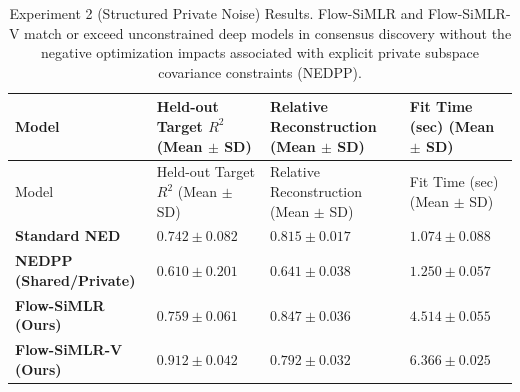 \documentclass[
  letterpaper,
]{report}
\begin{document}
\begin{longtable}[]{@{}
  >{\raggedright\arraybackslash}p{}
  >{\centering\arraybackslash}p{}
  >{\centering\arraybackslash}p{}
  >{\centering\arraybackslash}p{}@{}}
\caption{Experiment 2 (Structured Private Noise) Results. Flow-SiMLR and
Flow-SiMLR-V match or exceed unconstrained deep models in consensus
discovery without the negative optimization impacts associated with
explicit private subspace covariance constraints
(NEDPP).}\label{tbl-exp2-results}\tabularnewline
\toprule\noalign{}
\begin{minipage}[b]{\linewidth}\raggedright
Model
\end{minipage} & \begin{minipage}[b]{\linewidth}\centering
Held-out Target \(R^2\) (Mean \(\pm\) SD)
\end{minipage} & \begin{minipage}[b]{\linewidth}\centering
Relative Reconstruction (Mean \(\pm\) SD)
\end{minipage} & \begin{minipage}[b]{\linewidth}\centering
Fit Time (sec) (Mean \(\pm\) SD)
\end{minipage} \\
\midrule\noalign{}
\endfirsthead
\toprule\noalign{}
\begin{minipage}[b]{\linewidth}\raggedright
Model
\end{minipage} & \begin{minipage}[b]{\linewidth}\centering
Held-out Target \(R^2\) (Mean \(\pm\) SD)
\end{minipage} & \begin{minipage}[b]{\linewidth}\centering
Relative Reconstruction (Mean \(\pm\) SD)
\end{minipage} & \begin{minipage}[b]{\linewidth}\centering
Fit Time (sec) (Mean \(\pm\) SD)
\end{minipage} \\
\midrule\noalign{}
\endhead
\bottomrule\noalign{}
\endlastfoot
\textbf{Standard NED} & \(0.742 \pm 0.082\) & \(0.815 \pm 0.017\) &
\(1.074 \pm 0.088\) \\
\textbf{NEDPP (Shared/Private)} & \(0.610 \pm 0.201\) &
\(\mathbf{0.641 \pm 0.038}\) & \(1.250 \pm 0.057\) \\
\textbf{Flow-SiMLR (Ours)} & \(0.759 \pm 0.061\) & \(0.847 \pm 0.036\) &
\(4.514 \pm 0.055\) \\
\textbf{Flow-SiMLR-V (Ours)} & \(\mathbf{0.912 \pm 0.042}\) &
\(0.792 \pm 0.032\) & \(6.366 \pm 0.025\) \\
\end{longtable}
\end{document}
